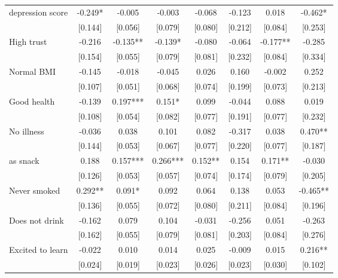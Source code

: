 \documentclass[12pt]{article}
\begin{document}
\begin{table}[ht]
\begin{center}
\begin{adjustbox}{width=1.2\textwidth,center=\textwidth}
\begin{tabular}{lccccccc}
{depression score } & {-0.249{*} } & {-0.005 } & {-0.003 } & {-0.068 } & {-0.123 } & {0.018 } & {-0.462{*} }\\
 & [0.144] & [0.056] & [0.079] & [0.080] & [0.212] & [0.084] & [0.253]\\
{High trust } & {-0.216 } & {-0.135{*}{*} } & {-0.139{*} } & {-0.080 } & {-0.064 } & {-0.177{*}{*} } & {-0.285 }\\
 & [0.154] & [0.055] & [0.079] & [0.081] & [0.232] & [0.084] & [0.334]\\
{Normal BMI } & {-0.145 } & {-0.018 } & {-0.045 } & {0.026 } & {0.160 } & {-0.002 } & {0.252 }\\
 & [0.107] & [0.051] & [0.068] & [0.074] & [0.199] & [0.073] & [0.213]\\
{Good health } & {-0.139 } & {0.197{*}{*}{*} } & {0.151{*} } & {0.099 } & {-0.044 } & {0.088 } & {0.019 }\\
 & [0.108] & [0.054] & [0.082] & [0.077] & [0.191] & [0.077] & [0.232]\\
{No illness } & {-0.036 } & {0.038 } & {0.101 } & {0.082 } & {-0.317 } & {0.038 } & {0.470{*}{*} }\\
 & [0.144] & [0.053] & [0.067] & [0.077] & [0.220] & [0.077] & [0.187]\\
{%
as snack } & {0.188 } & {0.157{*}{*}{*} } & {0.266{*}{*}{*} } & {0.152{*}{*} } & {0.154 } & {0.171{*}{*} } & {-0.030 }\\
 & [0.126] & [0.053] & [0.057] & [0.074] & [0.174] & [0.079] & [0.205]\\
{Never smoked } & {0.292{*}{*} } & {0.091{*} } & {0.092 } & {0.064 } & {0.138 } & {0.053 } & {-0.465{*}{*} }\\
 & [0.136] & [0.055] & [0.072] & [0.080] & [0.211] & [0.084] & [0.196]\\
{Does not drink } & {-0.162 } & {0.079 } & {0.104 } & {-0.031 } & {-0.256 } & {0.051 } & {-0.263 }\\
 & [0.162] & [0.055] & [0.079] & [0.081] & [0.203] & [0.084] & [0.276]\\
{Excited to learn } & {-0.022 } & {0.010 } & {0.014 } & {0.025 } & {-0.009 } & {0.015 } & {0.216{*}{*} }\\
 & [0.024] & [0.019] & [0.023] & [0.026] & [0.023] & [0.030] & [0.102]\\

\end{tabular}
\end{adjustbox}
\end{center}
\end{table}
\end{document}
